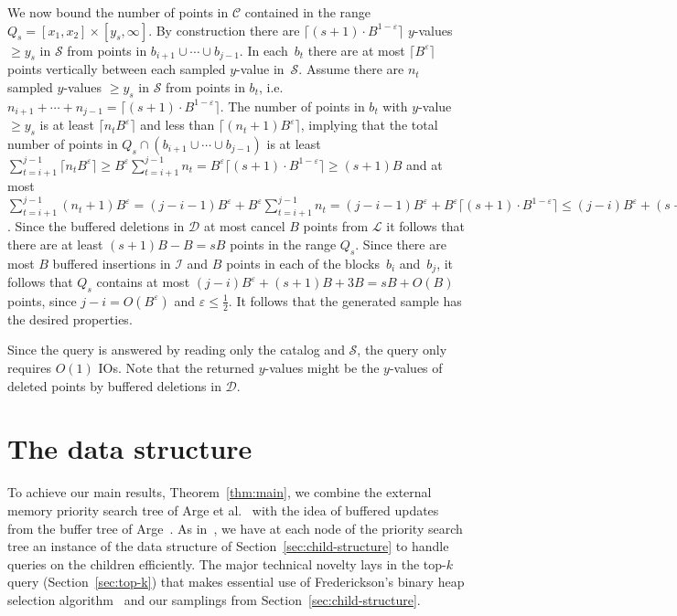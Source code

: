 \documentclass[11pt]{article}
\begin{document}
We now bound the number of points in $\mathcal{C}$ contained in the
range $Q_s=[x_1,x_2]\times[y_s,\infty]$. By construction there are
$\lceil (s+1)\cdot B^{1-\varepsilon}\rceil$ $y$-values $\geq y_s$ in
$\mathcal{S}$ from points in $b_{i+1}\cup\cdots\cup b_{j-1}$.
%
In each~$b_t$ there are at most $\lceil B^\varepsilon\rceil$ points
vertically between each sampled $y$-value in~$\mathcal{S}$. Assume
there are $n_t$ sampled $y$-values $\geq y_s$ in $\mathcal{S}$ from
points in $b_t$, i.e.\ $n_{i+1}+\cdots+n_{j-1} = \lceil (s+1)\cdot
B^{1-\varepsilon}\rceil$. The number of points in $b_t$ with $y$-value
$\geq y_s$ is at least $\lceil n_t B^\varepsilon\rceil$ and less than
$\lceil (n_t+1) B^\varepsilon\rceil$,
implying that the total number of points in $Q_s\cap (b_{i+1}\cup\cdots\cup b_{j-1})$ is at least 
$\sum_{t=i+1}^{j-1} \lceil n_tB^\varepsilon\rceil\geq 
B^\varepsilon \sum_{t=i+1}^{j-1} n_t =
B^\varepsilon\lceil (s+1)\cdot B^{1-\varepsilon}\rceil\geq (s+1)B$ and at most 
$\sum_{t=i+1}^{j-1} (n_t+1)B^\varepsilon
= (j-i-1)B^\varepsilon+B^\varepsilon\sum_{t=i+1}^{j-1} n_t
= (j-i-1)B^\varepsilon+B^\varepsilon\lceil (s+1)\cdot B^{1-\varepsilon}\rceil
\leq (j-i)B^\varepsilon+(s+1)B$.
Since the buffered deletions in $\mathcal{D}$ at most cancel $B$
points from $\mathcal{L}$ it follows that there are at least
$(s+1)B-B=sB$ points in the range $Q_s$. Since there are most $B$
buffered insertions in $\mathcal{I}$ and $B$ points in each of the
blocks~$b_i$ and~$b_j$, it follows that $Q_s$ contains at most
$(j-i)B^\varepsilon+(s+1)B+3B=sB+O(B)$ points, since
$j-i=O(B^\varepsilon)$ and $\varepsilon\leq \frac{1}{2}$.  It follows
that the generated sample has the desired properties.

Since the query is answered by reading only the catalog and
$\mathcal{S}$, the query only requires $O(1)$ IOs. Note that the
returned $y$-values might be the $y$-values of deleted points by
buffered deletions in $\mathcal{D}$.

\section{The data structure}
\label{sec:structure}

To achieve our main results, Theorem~\ref{thm:main}, we combine the
external memory priority search tree of Arge et al.~\cite{pods99asv}
with the idea of buffered updates from the buffer tree of
Arge~\cite{a03}.  As in~\cite{pods99asv}, we have at each node of the
priority search tree an instance of the data structure of
Section~\ref{sec:child-structure} to handle queries on the children
efficiently. The major technical novelty lays in the top-$k$ query
(Section~\ref{sec:top-k}) that makes essential use of Frederickson's
binary heap selection algorithm~\cite{f93} and our samplings from
Section~\ref{sec:child-structure}.
\end{document}
